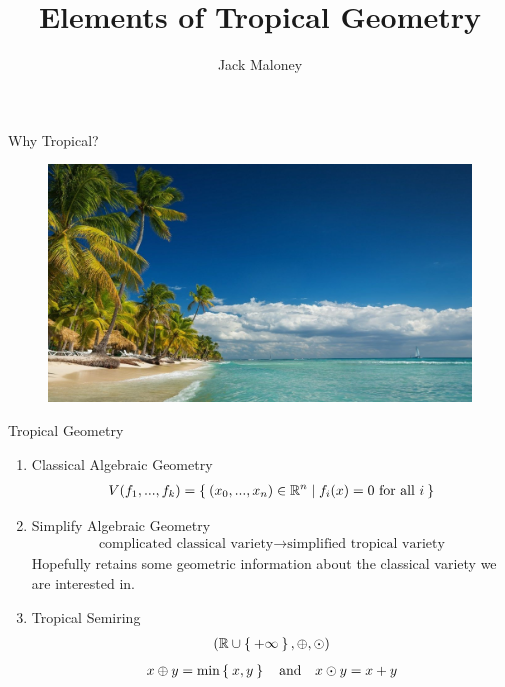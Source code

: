 \documentclass{beamer}
\title{Elements of Tropical Geometry}
\author{Jack Maloney}
\newcommand{\R}{\ensuremath{\mathbb{R}}}
\begin{document}
\begin{frame}
\titlepage
\end{frame}

\begin{frame}{Why Tropical?}
	\begin{figure}
		\includegraphics[width=\textwidth]{tropical.jpg}
	\end{figure}
\end{frame}

\begin{frame}{Tropical Geometry}
	\begin{enumerate}
	    \item Classical Algebraic Geometry
	    \begin{align}
	        V(f_1, ..., f_k) = \Set { (x_0, ..., x_n) \in \R^n | f_i(x) = 0 \text{ for all } i }
	    \end{align}
	    \pause
		\item Simplify Algebraic Geometry
			\begin{align}
				\text{complicated classical variety} \rightarrow \text{simplified tropical variety}
			\end{align}
		\pause
		Hopefully retains some geometric information about the classical variety we are interested in.
		\pause
		\item Tropical Semiring
		\begin{align}
			\left( \R \cup \Set{ + \infty }, \oplus, \odot \right) 
		\end{align}
		\pause
		\vspace{-2.5em}
		\begin{align}
			x \oplus y = \min \Set{x, y}
			\quad \text{and} \quad 
			x \odot y = x + y
		\end{align}
	\end{enumerate}
\end{frame}
\end{document}
